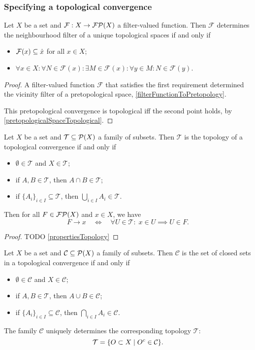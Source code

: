 \subsubsection{Specifying a topological convergence}

\begin{proposition}
Let $X$ be a set and $\mathcal{F}: X\to \powerfilters(X)$ a filter-valued function. Then $\mathcal{F}$ determines the neighbourhood filter of a unique topological spaces \textup{if and only if}
\begin{itemize}
\item $\mathcal{F}(x)\subseteq \pfilter{x}$ for all $x\in X$;
\item $\forall x\in X: \forall N\in \mathcal{F}(x): \exists M\in \mathcal{F}(x): \forall y\in M: N\in \mathcal{F}(y)$.
\end{itemize}
\end{proposition}
\begin{proof}
A filter-valued function $\mathcal{F}$ that satisfies the first requirement determined the vicinity filter of a pretopological space, \ref{filterFunctionToPretopology}.

This pretopological convergence is topological iff the second point holds, by \ref{pretopologicalSpaceTopological}.
\end{proof}

\begin{proposition}
Let $X$ be a set and $\mathcal{T}\subseteq \powerset(X)$ a family of subsets. Then $\mathcal{T}$ is the topology of a topological convergence \textup{if and only if}
\begin{itemize}
\item $\emptyset\in \mathcal{T}$ and $X\in \mathcal{T}$;
\item if $A,B\in \mathcal{T}$, then $A\cap B\in \mathcal{T}$;
\item if $\{A_i\}_{i\in I}\subseteq \mathcal{T}$, then $\bigcup_{i\in I}A_i \in \mathcal{T}$.
\end{itemize}
Then for all $F\in\powerfilters(X)$ and $x\in X$, we have
\[ F\to x \quad\iff\quad \forall U\in \mathcal{T}: \; x\in U \implies U\in F. \]
\end{proposition}
\begin{proof}
TODO \ref{propertiesTopology}
\end{proof}
\begin{corollary}
Let $X$ be a set and $\mathcal{C}\subseteq \powerset(X)$ a family of subsets. Then $\mathcal{C}$ is the set of closed sets in a topological convergence \textup{if and only if}
\begin{itemize}
\item $\emptyset\in \mathcal{C}$ and $X\in \mathcal{C}$;
\item if $A,B\in \mathcal{T}$, then $A\cup B\in \mathcal{C}$;
\item if $\{A_i\}_{i\in I}\subseteq \mathcal{C}$, then $\bigcap_{i\in I}A_i \in \mathcal{C}$.
\end{itemize}
The family $\mathcal{C}$ uniquely determines the corresponding topology $\mathcal{T}$:
\[ \mathcal{T} = \setbuilder{O\subset X}{O^c\in\mathcal{C}}. \]
\end{corollary}

